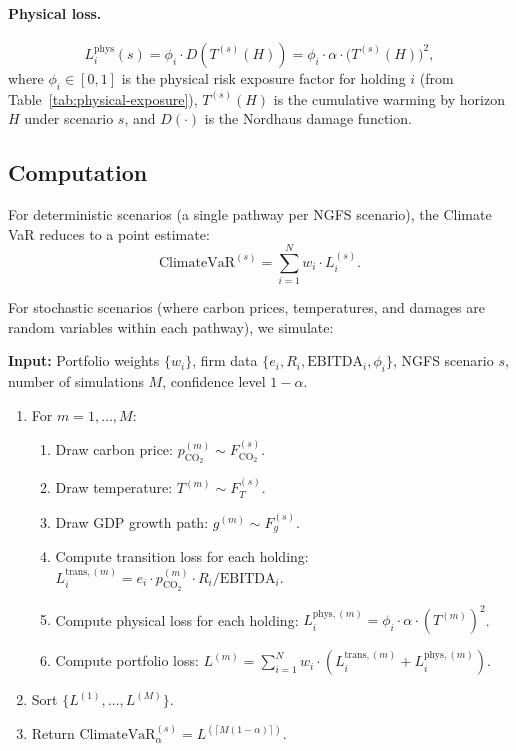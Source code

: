 \documentclass[11pt, a4paper]{article}
\theoremstyle{definition}
\theoremstyle{plain}
\theoremstyle{remark}
\begin{document}
\paragraph{Physical loss.}
\begin{equation}\label{eq:phys-loss}
    L_i^{\text{phys}}(s) = \phi_i \cdot D\!\left(T^{(s)}(H)\right)
    = \phi_i \cdot \alpha \cdot \bigl(T^{(s)}(H)\bigr)^2,
\end{equation}
where $\phi_i \in [0, 1]$ is the physical risk exposure factor for holding $i$
(from Table~\ref{tab:physical-exposure}), $T^{(s)}(H)$ is the cumulative warming
by horizon $H$ under scenario $s$, and $D(\cdot)$ is the Nordhaus damage function.

\subsection{Computation}

For deterministic scenarios (a single pathway per NGFS scenario), the Climate VaR
reduces to a point estimate:
\begin{equation}\label{eq:climate-var-deterministic}
    \text{ClimateVaR}^{(s)} = \sum_{i=1}^{N} w_i \cdot L_i^{(s)}.
\end{equation}

For stochastic scenarios (where carbon prices, temperatures, and damages are
random variables within each pathway), we simulate:

\begin{algorithmbox}[title={Algorithm 1: Stochastic Climate VaR}]
\label{alg:climate-var}
\textbf{Input:} Portfolio weights $\{w_i\}$, firm data $\{e_i, R_i,
\text{EBITDA}_i, \phi_i\}$, NGFS scenario $s$, number of simulations $M$,
confidence level $1 - \alpha$.
\begin{enumerate}
    \item For $m = 1, \ldots, M$:
    \begin{enumerate}[label=(\alph*)]
        \item Draw carbon price: $p_{\text{CO}_2}^{(m)} \sim
              F_{\text{CO}_2}^{(s)}$.
        \item Draw temperature: $T^{(m)} \sim F_T^{(s)}$.
        \item Draw GDP growth path: $g^{(m)} \sim F_g^{(s)}$.
        \item Compute transition loss for each holding:
              $L_i^{\text{trans},(m)} = e_i \cdot p_{\text{CO}_2}^{(m)} \cdot R_i
              / \text{EBITDA}_i$.
        \item Compute physical loss for each holding:
              $L_i^{\text{phys},(m)} = \phi_i \cdot \alpha \cdot (T^{(m)})^2$.
        \item Compute portfolio loss:
              $L^{(m)} = \sum_{i=1}^{N} w_i \cdot (L_i^{\text{trans},(m)} +
              L_i^{\text{phys},(m)})$.
    \end{enumerate}
    \item Sort $\{L^{(1)}, \ldots, L^{(M)}\}$.
    \item Return $\text{ClimateVaR}_\alpha^{(s)} = L^{(\lceil M(1-\alpha) \rceil)}$.
\end{enumerate}
\end{algorithmbox}
\end{document}
